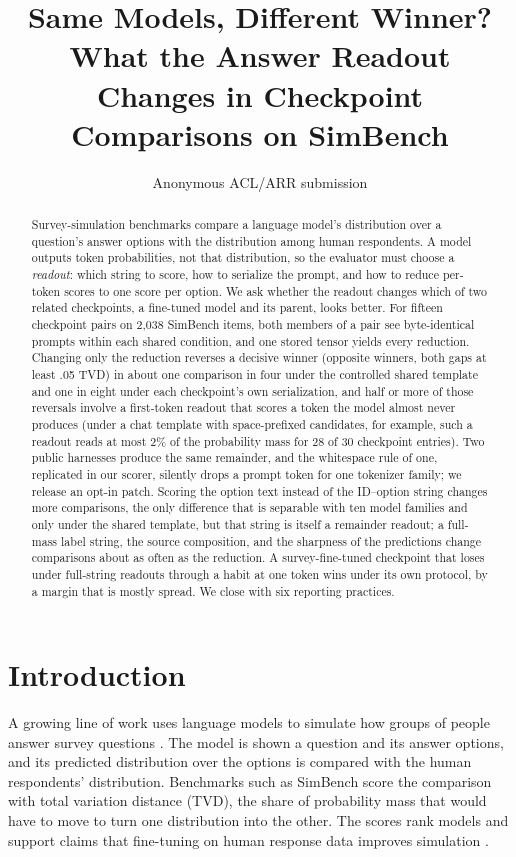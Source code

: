 \documentclass[11pt]{article}
\title{Same Models, Different Winner? What the Answer Readout Changes in Checkpoint Comparisons on SimBench}
\author{Anonymous ACL/ARR submission}
\date{}
\begin{document}
\maketitle

\begin{abstract}
Survey-simulation benchmarks compare a language model's distribution over a question's answer options with the distribution among human respondents. A model outputs token probabilities, not that distribution, so the evaluator must choose a \emph{readout}: which string to score, how to serialize the prompt, and how to reduce per-token scores to one score per option. We ask whether the readout changes which of two related checkpoints, a fine-tuned model and its parent, looks better. For fifteen checkpoint pairs on 2,038 SimBench items, both members of a pair see byte-identical prompts within each shared condition, and one stored tensor yields every reduction. Changing only the reduction reverses a decisive winner (opposite winners, both gaps at least .05 TVD) in about one comparison in four under the controlled shared template and one in eight under each checkpoint's own serialization, and half or more of those reversals involve a first-token readout that scores a token the model almost never produces (under a chat template with space-prefixed candidates, for example, such a readout reads at most 2\% of the probability mass for 28 of 30 checkpoint entries). Two public harnesses produce the same remainder, and the whitespace rule of one, replicated in our scorer, silently drops a prompt token for one tokenizer family; we release an opt-in patch. Scoring the option text instead of the ID--option string changes more comparisons, the only difference that is separable with ten model families and only under the shared template, but that string is itself a remainder readout; a full-mass label string, the source composition, and the sharpness of the predictions change comparisons about as often as the reduction. A survey-fine-tuned checkpoint that loses under full-string readouts through a habit at one token wins under its own protocol, by a margin that is mostly spread. We close with six reporting practices.
\end{abstract}

\section{Introduction}

A growing line of work uses language models to simulate how groups of people
answer survey questions
\cite{argyle2023out,santurkar2023opinions,durmus2024globalopinionqa,
hu-etal-2026-simbench}. The model is shown a question and its answer options,
and its predicted distribution over the options is compared with the human respondents' distribution. Benchmarks such as SimBench
score the comparison with total variation distance (TVD), the share of
probability mass that would have to move to turn one distribution into the
other. The scores rank models and support claims that fine-tuning on human
response data improves simulation
\cite{kolluri-etal-2025-finetuning,suh2025subpop,cao-etal-2025-specializing}.
\end{document}
